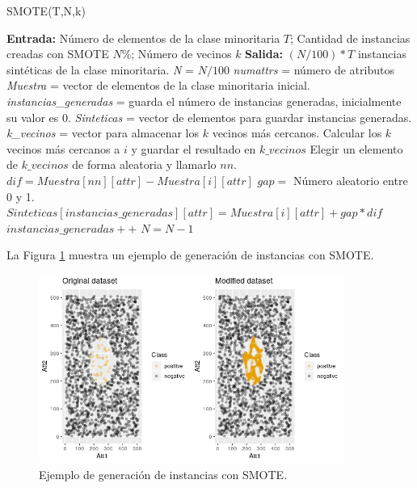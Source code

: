\begin{algorithm}[H]
	\caption{SMOTE(T,N,k)}
	\label{algo:smote}
	\begin{algorithmic}[0]
		\State \textbf{Entrada:} Número de elementos de la clase minoritaria $T$; Cantidad de instancias creadas con SMOTE $N\%$; Número de vecinos $k$
		\State \textbf{Salida:} $(N/100) * T$ instancias sintéticas de la clase minoritaria.
		\State \textit{N} = $N/100$
		\State \textit{numattrs} = número de atributos
		\State \textit{Muestra} = vector de elementos de la clase minoritaria inicial.
		\State \textit{instancias\_generadas} = guarda el número de instancias generadas, inicialmente su valor es 0.
		\State \textit{Sinteticas} = vector de elementos para guardar instancias generadas.
		\State \textit{k\_vecinos} = vector para almacenar los $k$ vecinos más cercanos.
			\State Calcular los $k$ vecinos más cercanos a $i$ y guardar el resultado en $k\_vecinos$
				\State Elegir un elemento de $k\_vecinos$ de forma aleatoria y llamarlo $nn$.
					\State $dif = Muestra[nn][attr] - Muestra[i][attr]$
					\State $gap =$ Número aleatorio entre 0 y 1.
					\State $Sinteticas[instancias\_generadas][attr] = Muestra[i][attr] + gap*dif$
				\EndFor
				\State $instancias\_generadas ++$
				\State $N = N-1$
			\EndWhile
		\EndFor
	\end{algorithmic}
\end{algorithm}

La Figura \ref{fig:41} muestra un ejemplo de generación de instancias con SMOTE.\newline

\begin{figure}[H]
	\centering
	\includegraphics[width=100mm]{imagenes/SMOTE_comparison.png}
	\caption{Ejemplo de generación de instancias con SMOTE.}
	\label{fig:41}
\end{figure}
\verticalspace

